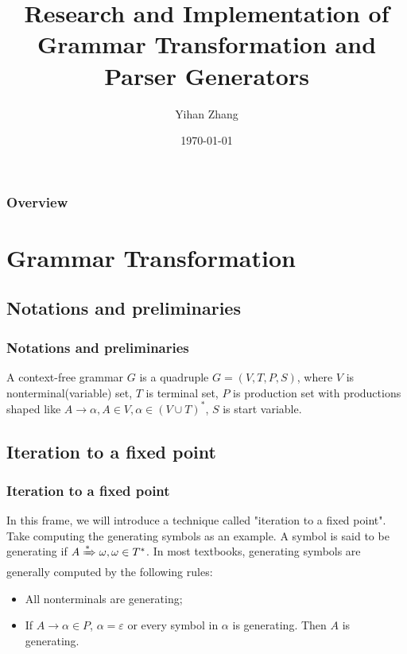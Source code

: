 \documentclass{beamer}
\title[Short title]{Research and Implementation of Grammar Transformation and Parser Generators} %
\author{Yihan Zhang} %
\institute[NEU] %
{
Northeastern University \\ %
\medskip
\textit{zhng1573@hotmail.com} %
}
\date{\today} %
\begin{document}
\begin{frame}
\titlepage %
\end{frame}

\begin{frame}
\frametitle{Overview} %
\tableofcontents %
\end{frame}

\section{Grammar Transformation}
\subsection{Notations and preliminaries}
\begin{frame}
\frametitle{Notations and preliminaries}
\begin{definition}
A context-free grammar\cite{cfg} $G$ is a quadruple $G=(V,T,P,S)$, where $V$ is nonterminal(variable) set, $T$ is terminal set, $P$ is production set with productions shaped like $A\to \alpha, A\in V, \alpha\in (V\cup T)^*$, $S$ is start variable.
\end{definition}
\end{frame}

\subsection{Iteration to a fixed point}
\begin{frame}
\frametitle{Iteration to a fixed point}
In this frame, we will introduce a technique called "iteration to a fixed point". Take computing the generating symbols as an example. A symbol is said to be generating if $A\xRightarrow[]{*} \omega, \omega\in T^*$. In most textbooks, generating symbols are generally computed by the following rules\cite{automata}:
\begin{itemize}
\item All nonterminals are generating;
\item If $A\to \alpha\in P$, $\alpha=\varepsilon$ or every symbol in $\alpha$ is generating. Then $A$ is generating.
\end{itemize}
\end{frame}
\end{document}
